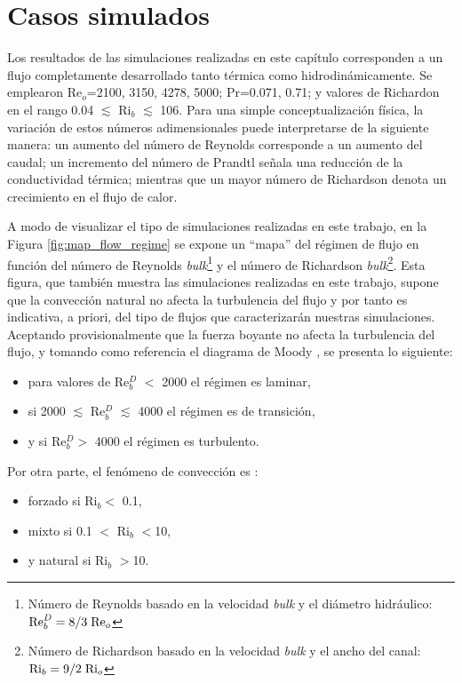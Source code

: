 \newpage

\section{Casos simulados} 

Los resultados de las simulaciones realizadas en este capítulo corresponden a un flujo completamente desarrollado tanto térmica como hidrodinámicamente. Se emplearon Re$_o$=2100, 3150, 4278, 5000; Pr=0.071, 0.71; y valores de Richardon en el rango 0.04 $\lesssim$ Ri$_b$ $\lesssim$ 106. Para una simple conceptualización física, la variación de estos números adimensionales puede interpretarse de la siguiente manera: un aumento del número de Reynolds corresponde a un aumento del caudal; un incremento del número de Prandtl señala una reducción de la conductividad térmica; mientras que un mayor número de Richardson denota un crecimiento en el flujo de calor.

A modo de visualizar el tipo de simulaciones realizadas en este trabajo, en la Figura \ref{fig:map_flow_regime} se expone un ``mapa''  del régimen de flujo en función del número de Reynolds \textit{bulk}\footnote{Número de Reynolds basado en la velocidad \textit{bulk} y el diámetro hidráulico: $\text{Re}^D_b = 8/3 \hspace*{1mm} \text{Re}_o$} y el número de Richardson \textit{bulk}\footnote{Número de Richardson basado en la velocidad \textit{bulk} y el ancho del canal: $\text{Ri}_b = 9/2 \hspace*{1mm} \text{Ri}_o$}. Esta figura, que también muestra las simulaciones realizadas en este trabajo, supone que la convección natural no afecta la turbulencia del flujo y por tanto es indicativa, a priori, del tipo de flujos que caracterizarán nuestras simulaciones. Aceptando provisionalmente que la fuerza boyante no afecta la turbulencia del flujo, y tomando como referencia el diagrama de Moody \cite{white}, se presenta lo siguiente:


\begin{itemize}
	\item para valores de Re$^D_b$ $<$ 2000 el régimen es laminar,
	\item si 2000 $\lesssim$ Re$^D_b$ $\lesssim$ 4000 el régimen es de transición,
	\item y si Re$^D_b>$ 4000 el régimen es turbulento.
\end{itemize}
Por otra parte, el fenómeno de convección es \cite{incropera,cengelheat}:

\begin{itemize}
	\item forzado si Ri$_b<$ 0.1,
	\item mixto si 0.1 $<$ Ri$_b$ $<$10,
	\item y natural si Ri$_b$ $>$10.
\end{itemize}

